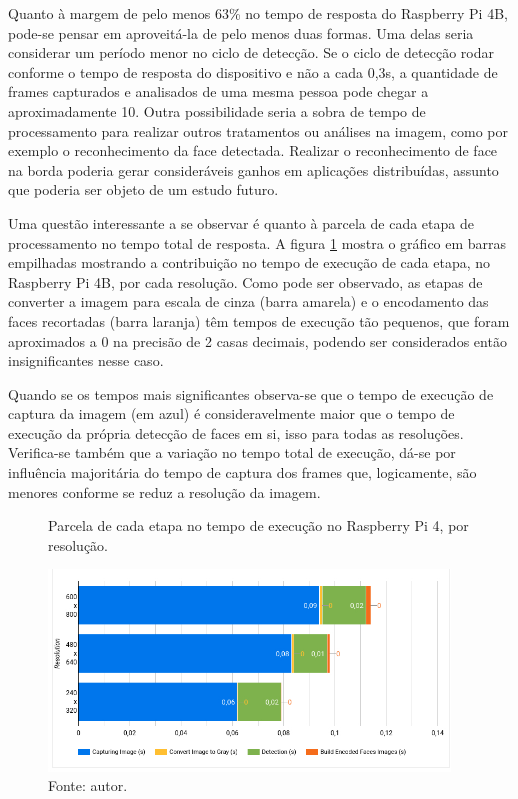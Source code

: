 Quanto à margem de pelo menos 63\% no tempo de resposta do Raspberry Pi 4B, pode-se pensar em aproveitá-la de pelo menos duas formas. Uma delas seria considerar um período menor no ciclo de detecção. Se o ciclo de detecção rodar conforme o tempo de resposta do dispositivo e não a cada 0,3s, a quantidade de frames capturados e analisados de uma mesma pessoa pode chegar a aproximadamente 10. Outra possibilidade seria a sobra de tempo de processamento para realizar outros tratamentos ou análises na imagem, como por exemplo o reconhecimento da face detectada. Realizar o reconhecimento de face na borda poderia gerar consideráveis ganhos em aplicações distribuídas, assunto que poderia ser objeto de um estudo futuro.

Uma questão interessante a se observar é quanto à parcela de cada etapa de processamento no tempo total de resposta. A figura \ref{fig:cena2_parcelas_etapas_resolucao_rapi4} mostra o gráfico em barras empilhadas mostrando a contribuição no tempo de execução de cada etapa, no Raspberry Pi 4B, por cada resolução. Como pode ser observado, as etapas de converter a imagem para escala de cinza (barra amarela) e o encodamento das faces recortadas (barra laranja) têm tempos de execução tão pequenos, que foram aproximados a 0 na precisão de 2 casas decimais, podendo ser considerados então insignificantes nesse caso.

Quando se os tempos mais significantes observa-se que o tempo de execução de captura da imagem (em azul) é consideravelmente maior que o tempo de execução da própria detecção de faces em si, isso para todas as resoluções. Verifica-se também que a variação no tempo total de execução, dá-se por influência majoritária do tempo de captura dos frames que, logicamente, são menores conforme se reduz a resolução da imagem. 

\begin{figure}[h]
    \centering
    \caption[Parcela de cada etapa no tempo de execução no Raspberry Pi 4, por resolução.]{Parcela de cada etapa no tempo de execução no Raspberry Pi 4, por resolução.}
    \includegraphics[width=0.95\textwidth]{Cap4_Experimentos_Realizados/Figures/cena2_parcelas_etapas_resolucao_rapi4.jpg}
    \caption*{Fonte: autor.}
    \label{fig:cena2_parcelas_etapas_resolucao_rapi4}
\end{figure}

